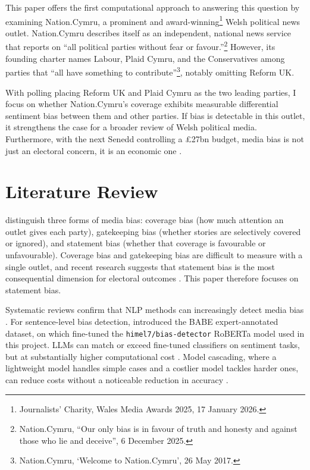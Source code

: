 \documentclass{article}
\begin{document}
This paper offers the first computational approach to answering this question by examining Nation.Cymru, a prominent and award-winning\footnote{Journalists' Charity, Wales Media Awards 2025, 17 January 2026.} Welsh political news outlet. Nation.Cymru describes itself as an independent, national news service that reports on ``all political parties without fear or favour.''\footnote{Nation.Cymru, ``Our only bias is in favour of truth and honesty and against those who lie and deceive'', 6 December 2025.} However, its founding charter names Labour, Plaid Cymru, and the Conservatives among parties that ``all have something to contribute''\footnote{Nation.Cymru, `Welcome to Nation.Cymru', 26 May 2017.}, notably omitting Reform UK.

With polling placing Reform UK and Plaid Cymru as the two leading parties, I focus on whether Nation.Cymru's coverage exhibits measurable differential sentiment bias between them and other parties. If bias is detectable in this outlet, it strengthens the case for a broader review of Welsh political media. Furthermore, with the next Senedd controlling a \pounds27bn budget, media bias is not just an electoral concern, it is an economic one \citep{besley2006, larcinese2011}.

\section{Literature Review}

\citet{dalessio2000} distinguish three forms of media bias: coverage bias (how much attention an outlet gives each party), gatekeeping bias (whether stories are selectively covered or ignored), and statement bias (whether that coverage is favourable or unfavourable). Coverage bias and gatekeeping bias are difficult to measure with a single outlet, and recent research suggests that statement bias is the most consequential dimension for electoral outcomes \citep{eberl2017}. This paper therefore focuses on statement bias.

Systematic reviews confirm that NLP methods can increasingly detect media bias \citep{rodrigogines2024, spinde2023, kuila2024}. For sentence-level bias detection, \citet{spinde2021} introduced the BABE expert-annotated dataset, on which \citet{ghosh2025} fine-tuned the \texttt{himel7/bias-detector} RoBERTa model used in this project. LLMs can match or exceed fine-tuned classifiers on sentiment tasks, but at substantially higher computational cost \citep{shao2025}. Model cascading, where a lightweight model handles simple cases and a costlier model tackles harder ones, can reduce costs without a noticeable reduction in accuracy \citep{yue2024}.
\end{document}

